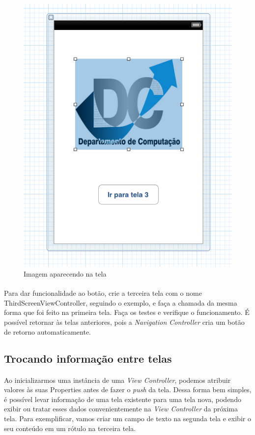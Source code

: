 \documentclass[a4paper,12pt,brazil,doubleside]{book}
\begin{document}
\begin{singlespace}
\begin{figure}[H]
  \centering
  \includegraphics[totalheight=0.5\textheight]{figuras/2/xib2_tela2.png}
  \caption{Imagem aparecendo na tela}
  \label{fig:a}
\end{figure}

\bigskip

\paragraph{}Para dar funcionalidade ao botão, crie a terceira tela com o nome ThirdScreenViewController, seguindo o exemplo, e faça a chamada da mesma forma que foi feito na primeira tela. Faça os testes e verifique o funcionamento. É possível retornar às telas anteriores, pois a \emph{Navigation Controller} cria um botão de retorno automaticamente.

\bigskip

\subsection{Trocando informação entre telas}

\paragraph{}Ao inicializarmos uma instância de uma \emph{View Controller}, podemos atribuir valores às suas Properties antes de fazer o \emph{push} da tela. Dessa forma bem simples, é possível levar informação de uma tela existente para uma tela nova, podendo exibir ou tratar esses dados convenientemente na \emph{View Controller} da próxima tela. Para exemplificar, vamos criar um campo de texto na segunda tela e exibir o seu conteúdo em um rótulo na terceira tela.

\end{singlespace}
\end{document}
